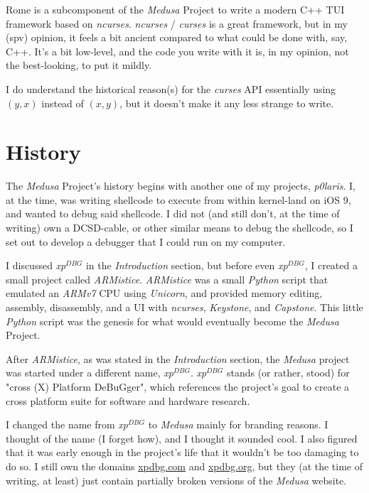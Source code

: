 \documentclass{article}
\newcommand{\xpDBG}{\textit{xp$^{DBG}$}\xspace}
\newcommand{\Medusa}{\textit{Medusa}\xspace}
\begin{document}
	Rome is a subcomponent of the \textit{Medusa} Project to write a modern C++
	TUI framework based on \textit{ncurses}. \textit{ncurses} / \textit{curses}
	is a great framework, but in my (spv) opinion, it feels a bit ancient
	compared to what could be done with, say, C++. It's a bit low-level, and the
	code you write with it is, in my opinion, not the best-looking, to put it
	mildly.

	I do understand the historical reason(s) for the \textit{curses} API
	essentially using $(y,x)$ instead of $(x,y)$, but it doesn't make it any
	less strange to write.

	\section{History}
	The \textit{Medusa} Project's history begins with another one of my
	projects, \textit{p0laris}. I, at the time, was writing shellcode to execute
	from within kernel-land on iOS 9, and wanted to debug said shellcode. I did
	not (and still don't, at the time of writing) own a DCSD-cable, or other
	similar means to debug the shellcode, so I set out to develop a debugger
	that I could run on my computer.

	I discussed \xpDBG in the \textit{Introduction} section, but before even
	\xpDBG, I created a small project called \textit{ARMistice}.
	\textit{ARMistice} was a small \textit{Python} script that emulated an
	\textit{ARMv7} CPU using \textit{Unicorn}, and provided memory editing,
	assembly, disassembly, and a UI with \textit{ncurses}, \textit{Keystone},
	and \textit{Capstone}. This little \textit{Python} script was the genesis
	for what would eventually become the \textit{Medusa} Project.
	
	After \textit{ARMistice}, as was stated in the \textit{Introduction}
	section, the \textit{Medusa} project was started under a different name,
	\xpDBG. \xpDBG stands (or rather, stood) for "cross (X) Platform
	DeBuGger", which references the project's goal to create a cross platform
	suite for software and hardware research. 

	I changed the name from \xpDBG to \Medusa mainly for branding reasons. I
	thought of the name (I forget how), and I thought it sounded cool. I also
	figured that it was early enough in the project's life that it wouldn't be
	too damaging to do so. I still own the domains
	\href{https://xpdbg.com}{xpdbg.com} and \href{https://xpdbg.org}{xpdbg.org},
	but they (at the time of writing, at least) just contain partially broken
	versions of the \Medusa website.
\end{document}
